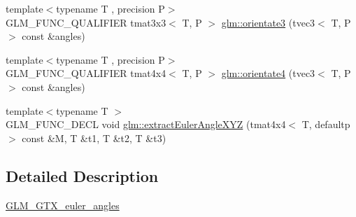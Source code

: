\begin{DoxyCompactItemize}
\item 
{\footnotesize template$<$typename T , precision P$>$ }\\G\+L\+M\+\_\+\+F\+U\+N\+C\+\_\+\+Q\+U\+A\+L\+I\+F\+I\+ER tmat3x3$<$ T, P $>$ \hyperlink{group__gtx__euler__angles_ga33f0d790cecd8337ee83f8e3a8109b11}{glm\+::orientate3} (tvec3$<$ T, P $>$ const \&angles)
\item 
{\footnotesize template$<$typename T , precision P$>$ }\\G\+L\+M\+\_\+\+F\+U\+N\+C\+\_\+\+Q\+U\+A\+L\+I\+F\+I\+ER tmat4x4$<$ T, P $>$ \hyperlink{group__gtx__euler__angles_ga4e25c9468b6f002c76e9a2412bcfa503}{glm\+::orientate4} (tvec3$<$ T, P $>$ const \&angles)
\item 
{\footnotesize template$<$typename T $>$ }\\G\+L\+M\+\_\+\+F\+U\+N\+C\+\_\+\+D\+E\+CL void \hyperlink{group__gtx__euler__angles_gad5838a4c87ce2b8ee4c4e17bd162fd14}{glm\+::extract\+Euler\+Angle\+X\+YZ} (tmat4x4$<$ T, defaultp $>$ const \&M, T \&t1, T \&t2, T \&t3)
\end{DoxyCompactItemize}


\subsection{Detailed Description}
\hyperlink{group__gtx__euler__angles}{G\+L\+M\+\_\+\+G\+T\+X\+\_\+euler\+\_\+angles} 